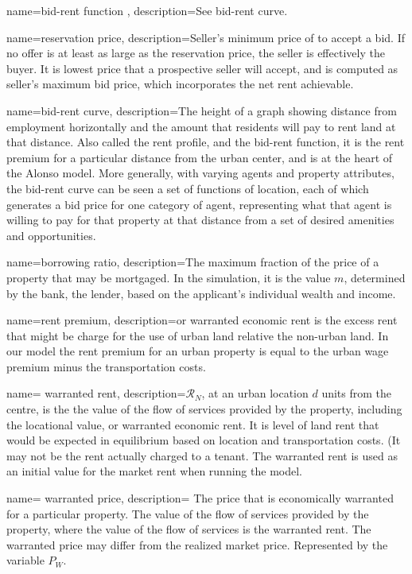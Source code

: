 {
name=bid-rent function ,
description={See \gls{bid-rent curve}.}
}

{
name=reservation price,
description={Seller's minimum price of to accept a bid. If no offer is at least as large as the reservation price, the seller is effectively the buyer. It is lowest price that a prospective seller will accept, and is computed as seller's maximum bid price, which incorporates the net rent achievable.}
}

{
name=bid-rent curve,
description={The height of a graph showing distance from employment horizontally and the amount that residents will pay to rent land at that distance. Also called the \gls{rent profile}, and the \gls{bid-rent function}, it is the \gls{rent premium} for a particular distance from the urban center, and is at the heart of the \gls{Alonso model}. More generally, with varying agents and property attributes, the bid-rent curve can be seen a set of functions of location, each of which generates a bid price for one category of agent, representing what that agent is willing to pay for that property at that distance from a set of desired amenities and opportunities.}
}

{
name=borrowing ratio,
description={The maximum fraction of the price of a property that may be mortgaged. In the simulation, it is the value $m$, determined by the bank, the lender, based on the applicant's individual \gls{wealth} and income.} 
}

{
name=rent premium,
description={or \gls{warranted economic rent} is the excess rent  that might be charge for the use of urban land relative the non-urban land. In our model the rent premium for an urban property is equal to the urban wage premium minus the transportation costs. }
}

{
name= warranted rent,
description={$\mathcal{R}_N$, at an  urban location  $d$ units from the centre, is the the value of the flow of services provided by the property, including the locational value, or \gls{warranted economic rent}. It is level of land rent that would be expected in equilibrium based on location and transportation costs.  (It may not be the rent actually charged to a tenant. The warranted rent is used as an initial value  for the market rent when running the model. }
}

{
name= warranted price,
description={%
The price that is economically warranted for a particular property. The  value of the flow of services provided by the property, where the value of the flow of services is the \gls{warranted rent}. %
The warranted price may differ from the realized \gls{market price}. Represented by the variable $P_W$. }
}

